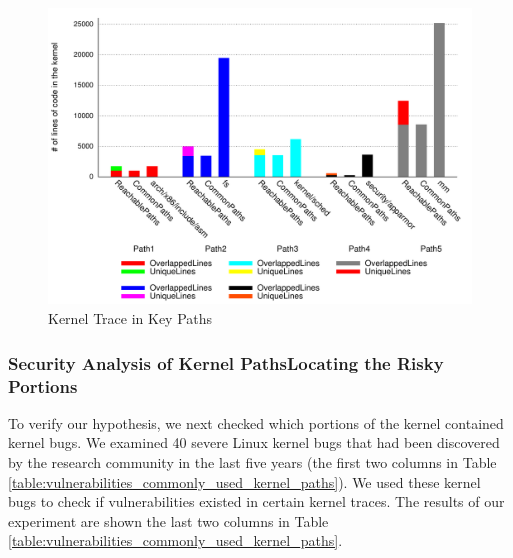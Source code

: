 \begin{figure}
\centering
\includegraphics[width=1.0\columnwidth]{diagram/lind_oakland16_diagram_02.pdf}
\caption{Kernel Trace in Key Paths}
\label{fig:key_paths_trace}
\end{figure}

\subsubsection{Security Analysis of Kernel Paths\textendash Locating the
Risky Portions}

To verify our hypothesis, we next checked which portions of
the kernel contained kernel bugs. We examined 40 severe Linux kernel
bugs that had been discovered by the research community in the last five
years (the first two columns in Table 
\ref{table:vulnerabilities_commonly_used_kernel_paths}). 
We used these kernel bugs to check if vulnerabilities existed in certain
kernel traces.   
The results of our experiment are shown the last two columns in Table
\ref{table:vulnerabilities_commonly_used_kernel_paths}.

